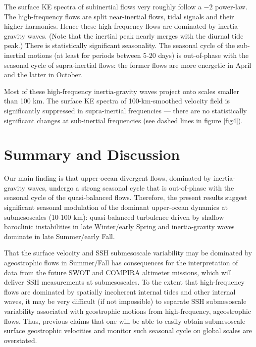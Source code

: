 \documentclass[grl]{agutex2015}
\begin{document}
\begin{article}
The surface KE spectra of subinertial flows very roughly follow a $-2$ power-law.
The high-frequency flows are split near-inertial flows, tidal signals and their
higher harmonics. Hence these high-frequency flows are dominated by inertia-gravity
waves. (Note that the inertial peak nearly merges with the
diurnal tide peak.) There is statistically significant seasonality. The seasonal
cycle of the sub-inertial motions (at least for periods between 5-20 days)
is out-of-phase with the seasonal cycle of supra-inertial flows: the former flows
are more energetic in April and the latter in October.

Most of these high-frequency inertia-gravity waves project onto scales smaller
than 100 km. The surface KE spectra of 100-km-smoothed velocity field is significantly
suppressed in supra-inertial frequencies --- there are no statistically significant
changes at sub-inertial frequencies (see dashed lines in figure \ref{fig4}).





\section{Summary and Discussion}
Our main finding is that
upper-ocean divergent flows, dominated by inertia-gravity waves, undergo
a strong seasonal cycle that is out-of-phase with the seasonal cycle of
the quasi-balanced flows. Therefore, the present results suggest significant
seasonal modulation of the dominant upper-ocean dynamics at submesoscales
(10-100 km): quasi-balanced turbulence driven by shallow baroclinic instabilities
in late Winter/early Spring
and inertia-gravity waves dominate in late Summer/early Fall.

That the  surface velocity and SSH submesoscale variability may be
dominated by ageostrophic flows in
Summer/Fall has consequences for the interpretation of data from
the future SWOT and COMPIRA altimeter missions,
which will deliver SSH measurements at submesoscales. To the extent that
high-frequency flows are dominated by spatially incoherent internal tides and other
internal waves, it may be very difficult (if not impossible) to
separate SSH submesoscale variability associated with geostrophic motions
from high-frequency, ageostrophic flows. Thus, previous claims that
one will be able to easily obtain submesoscale surface
geostrophic velocities and monitor such seasonal cycle on global scales
\citep{sasaki_etal2014,qiu_etal2014} are overstated.


\end{article}
\end{document}
